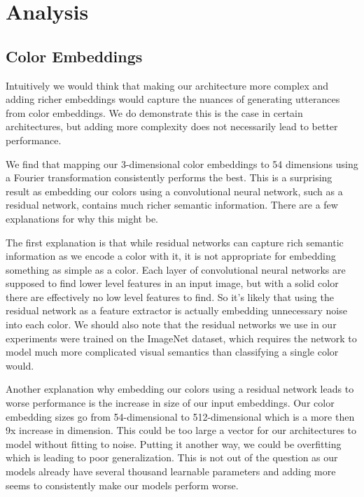 \section{Analysis}

\subsection{Color Embeddings}

Intuitively we would think that making our architecture more complex and adding richer embeddings would capture the nuances of generating utterances from color embeddings. We do demonstrate this is the case in certain architectures, but adding more complexity does not necessarily lead to better performance.

\par
We find that mapping our 3-dimensional color embeddings to 54 dimensions using a Fourier transformation consistently performs the best. This is a surprising result as embedding our colors using a convolutional neural network, such as a residual network, contains much richer semantic information. There are a few explanations for why this might be.

\par
The first explanation is that while residual networks can capture rich semantic information as we encode a color with it, it is not appropriate for embedding something as simple as a color. Each layer of convolutional neural networks are supposed to find lower level features in an input image, but with a solid color there are effectively no low level features to find. So it’s likely that using the residual network as a feature extractor is actually embedding unnecessary noise into each color. We should also note that the residual networks we use in our experiments were trained on the ImageNet dataset, which requires the network to model much more complicated visual semantics than classifying a single color would.

\par
Another explanation why embedding our colors using a residual network leads to worse performance is the increase in size of our input embeddings. Our color embedding sizes go from 54-dimensional to 512-dimensional which is a more then 9x increase in dimension. This could be too large a vector for our architectures to model without fitting to noise. Putting it another way, we could be overfitting which is leading to poor generalization. This is not out of the question as our models already have several thousand learnable parameters and adding more seems to consistently make our models perform worse.

